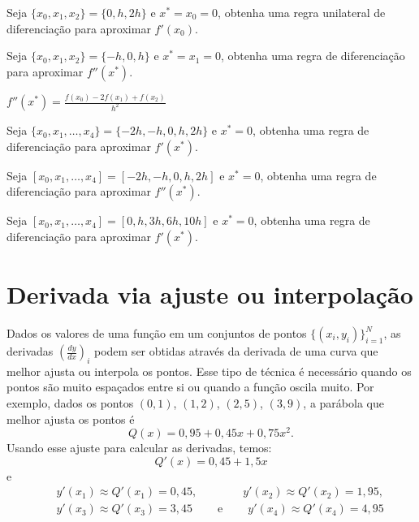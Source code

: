 \begin{exer}
Seja $\{x_0, x_1, x_2\}=\{0, h, 2h\}$ e $x^*=x_0=0$, obtenha uma regra unilateral de diferenciação para aproximar $f'(x_0)$.
\end{exer}%

\begin{exer}
Seja $\{x_0, x_1, x_2\}=\{-h, 0, h\}$ e $x^*=x_1=0$, obtenha uma regra de diferenciação para aproximar $f''(x^*)$.
\end{exer}
\begin{resp}
 $f''(x^*)=\frac{f(x_0)-2f(x_1)+f(x_2)}{h^2}$ 
\end{resp}


\begin{exer}
Seja $\{x_0, x_1, \ldots, x_4\}=\{-2h, -h, 0, h, 2h\}$ e $x^*=0$, obtenha uma regra de diferenciação para aproximar $f'(x^*)$.
\end{exer}%

\begin{exer}
Seja $[x_0,x_1,\ldots ,x_4]=[-2h,-h,0,h,2h]$ e $x^*=0$, obtenha uma regra de diferenciação para aproximar $f''(x^*)$.
\end{exer}%

\begin{exer}
Seja $[x_0,x_1,\ldots ,x_4]=[0,h,3h,6h,10h]$ e $x^*=0$, obtenha uma regra de diferenciação para aproximar $f'(x^*)$.
\end{exer}%

\section{Derivada via ajuste ou interpolação}

Dados os valores de uma função em um conjuntos de pontos $\{(x_i,y_i)\}_{i=1}^N$, as derivadas $\left(\frac{dy}{dx}\right)_i$ podem ser obtidas através da derivada de uma curva que melhor ajusta ou interpola os pontos. Esse tipo de técnica é necessário quando os pontos são muito espaçados entre si ou quando a função oscila muito. Por exemplo, dados os pontos $(0,1)$, $(1,2)$, $(2,5)$, $(3,9)$, a parábola que melhor ajusta os pontos é
\begin{equation}
Q(x)=0,95 + 0,45x + 0,75x^2.
\end{equation}
Usando esse ajuste para calcular as derivadas, temos:
\begin{equation}
Q'(x)=0,45 + 1,5x
\end{equation}
e
\begin{eqnarray}
&&y'(x_1)\approx Q'(x_1)=0,45, \qquad\qquad y'(x_2)\approx Q'(x_2)=1,95, \\&& y'(x_3)\approx Q'(x_3)=3,45 \qquad ~ \text{e} ~ \qquad y'(x_4)\approx Q'(x_4)=4,95
\end{eqnarray}

